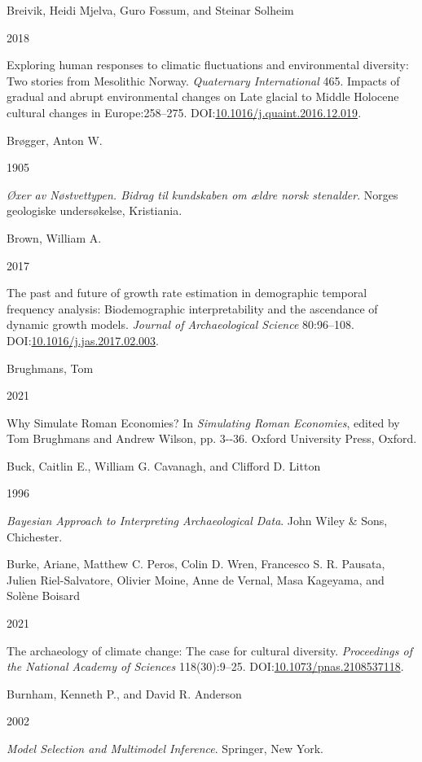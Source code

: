 \documentclass[
  12pt,
  a4paper,
  oneside]{book}
\newlength{\cslhangindent}
\newlength{\csllabelwidth}
\newlength{\cslentryspacingunit} %
\newenvironment{CSLReferences}[2] %
 {%
  \setlength{\parindent}{0pt}
  \ifodd #1
  \let\oldpar\par
  \def\par{\hangindent=\cslhangindent\oldpar}
  \fi
  \setlength{\parskip}{#2\cslentryspacingunit}
 }%
 {}
\newcommand{\CSLBlock}[1]{#1\hfill\break}
\newcommand{\CSLLeftMargin}[1]{\parbox[t]{\csllabelwidth}{#1}}
\newcommand{\CSLRightInline}[1]{\parbox[t]{\linewidth - \csllabelwidth}{#1}\break}
\begin{document}
\begin{CSLReferences}{0}{0}
\leavevmode{}%
\CSLBlock{Breivik, Heidi Mjelva, Guro Fossum, and Steinar Solheim}
\CSLLeftMargin{ 2018}
\CSLRightInline{Exploring human responses to climatic fluctuations and environmental diversity: Two stories from Mesolithic Norway. \emph{Quaternary International} 465. Impacts of gradual and abrupt environmental changes on Late glacial to Middle Holocene cultural changes in Europe:258--275. DOI:\href{https://doi.org/10.1016/j.quaint.2016.12.019}{10.1016/j.quaint.2016.12.019}.}

\leavevmode{}%
\CSLBlock{Brøgger, Anton W.}
\CSLLeftMargin{ 1905}
\CSLRightInline{\emph{{Øxer av Nøstvettypen. Bidrag til kundskaben om ældre norsk stenalder}}. Norges geologiske undersøkelse, Kristiania.}

\leavevmode{}%
\CSLBlock{Brown, William A.}
\CSLLeftMargin{ 2017}
\CSLRightInline{{The past and future of growth rate estimation in demographic temporal frequency analysis: Biodemographic interpretability and the ascendance of dynamic growth models}. \emph{Journal of Archaeological Science} 80:96--108. DOI:\href{https://doi.org/10.1016/j.jas.2017.02.003}{10.1016/j.jas.2017.02.003}.}

\leavevmode{}%
\CSLBlock{Brughmans, Tom}
\CSLLeftMargin{ 2021}
\CSLRightInline{{Why Simulate Roman Economies?} In \emph{{Simulating Roman Economies}}, edited by Tom Brughmans and Andrew Wilson, pp. 3-\/-36. Oxford University Press, Oxford.}

\leavevmode{}%
\CSLBlock{Buck, Caitlin E., William G. Cavanagh, and Clifford D. Litton}
\CSLLeftMargin{ 1996}
\CSLRightInline{\emph{{Bayesian Approach to Interpreting Archaeological Data}}. John Wiley \& Sons, Chichester.}

\leavevmode{}%
\CSLBlock{Burke, Ariane, Matthew C. Peros, Colin D. Wren, Francesco S. R. Pausata, Julien Riel-Salvatore, Olivier Moine, Anne de Vernal, Masa Kageyama, and Solène Boisard}
\CSLLeftMargin{ 2021}
\CSLRightInline{The archaeology of climate change: The case for cultural diversity. \emph{Proceedings of the National Academy of Sciences} 118(30):9--25. DOI:\href{https://doi.org/10.1073/pnas.2108537118}{10.1073/pnas.2108537118}.}

\leavevmode{}%
\CSLBlock{Burnham, Kenneth P., and David R. Anderson}
\CSLLeftMargin{ 2002}
\CSLRightInline{\emph{{Model Selection and Multimodel Inference}}. Springer, New York.}


\end{CSLReferences}
\end{document}

